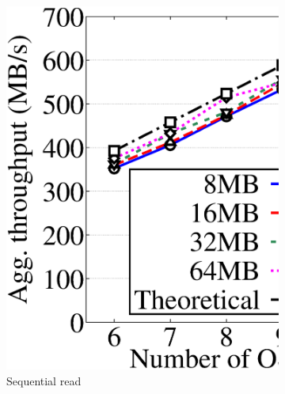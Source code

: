 \begin{figure}[!t]
\begin{subfigure}{0.48\linewidth}
     \includegraphics[width=\linewidth]{charts/transfer/eps/down/rdp_6}
     \caption{Sequential read}
     \label{fig:rdp_read}
 \end{subfigure}
 \hspace{0.005\linewidth}
 \begin{subfigure}{0.48\linewidth}

\end{subfigure}
\end{figure}

